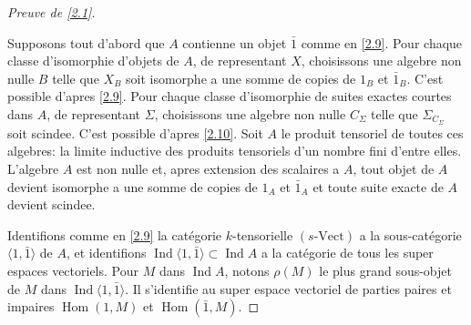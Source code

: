 \documentclass[11pt,a4paper]{article}
\theoremstyle{plain}
\theoremstyle{definition}
\DeclareMathOperator{\Hom}{Hom}
\DeclareMathOperator{\Ind}{Ind}
\newcommand{\Vect}{\mathrm{Vect}}
\begin{document}
\begin{proof}[Preuve de \ref{2.1}]\label{2.11}

Supposons tout d'abord que $A$ contienne un objet $\bar{1}$ comme en \ref{2.9}. Pour chaque classe d'isomorphie d'objets de $A$, de representant $X$, choisissons une algebre non nulle $B$ telle que $X_B$ soit isomorphe a une somme de copies de $1_B$ et $\bar{1}_B$. C'est possible d'apres \ref{2.9}. Pour chaque classe d'isomorphie de suites exactes courtes dans $A$, de representant $\Sigma$, choisissons une algebre non nulle $C_\Sigma$ telle que $\Sigma_{C_\Sigma}$ soit scindee. C'est possible d'apres \ref{2.10}. Soit $A$ le produit tensoriel de toutes ces algebres: la limite inductive des produits tensoriels d'un nombre fini d'entre elles. L'algebre $A$ est non nulle et, apres extension des scalaires a $A$, tout objet de $A$ devient isomorphe a une somme de copies de $1_A$ et $\bar{1}_A$ et toute suite exacte de $A$ devient scindee.

Identifions comme en \ref{2.9} la cat\'egorie $k$-tensorielle $(s\text{-}\Vect)$ a la sous-cat\'egorie $\langle1,\bar{1}\rangle$ de $A$, et identifions $\Ind\langle1,\bar{1}\rangle\subset\Ind A$ a la cat\'egorie de tous les super espaces vectoriels. Pour $M$ dans $\Ind A$, notons $\rho(M)$ le plus grand sous-objet de $M$ dans $\Ind\langle1,\bar{1}\rangle$. Il s'identifie au super espace vectoriel de parties paires et impaires $\Hom(1,M)$ et $\Hom(\bar{1},M)$.


\end{proof}
\end{document}
